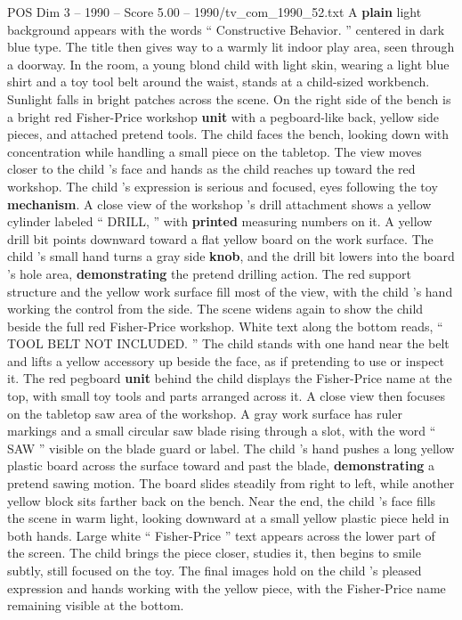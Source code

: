 \begin{textsample}{POS Dim 3 – 1990 – Score 5.00 – 1990/tv\_com\_1990\_52.txt}  \label{ex:f3_pos_056}
A \textbf{plain} light background appears with the words “ Constructive Behavior. ” centered in dark blue type.
The title then gives way to a warmly lit indoor play area, seen through a doorway.
In the room, a young blond child with light skin, wearing a light blue shirt and a toy tool belt around the waist, stands at a child-sized workbench.
Sunlight falls in bright patches across the scene.
On the right side of the bench is a bright red Fisher-Price workshop \textbf{unit} with a pegboard-like back, yellow side pieces, and attached pretend tools.
The child faces the bench, looking down with concentration while handling a small piece on the tabletop.
The view moves closer to the child ’s face and hands as the child reaches up toward the red workshop.
The child ’s expression is serious and focused, eyes following the toy \textbf{mechanism}.
A close view of the workshop ’s drill attachment shows a yellow cylinder labeled “ DRILL, ” with \textbf{printed} measuring numbers on it.
A yellow drill bit points downward toward a flat yellow board on the work surface.
The child ’s small hand turns a gray side \textbf{knob}, and the drill bit lowers into the board ’s hole area, \textbf{demonstrating} the pretend drilling action.
The red support structure and the yellow work surface fill most of the view, with the child ’s hand working the control from the side.
The scene widens again to show the child beside the full red Fisher-Price workshop.
White text along the bottom reads, “ TOOL BELT NOT INCLUDED. ” The child stands with one hand near the belt and lifts a yellow accessory up beside the face, as if pretending to use or inspect it.
The red pegboard \textbf{unit} behind the child displays the Fisher-Price name at the top, with small toy tools and parts arranged across it.
A close view then focuses on the tabletop saw area of the workshop.
A gray work surface has ruler markings and a small circular saw blade rising through a slot, with the word “ SAW ” visible on the blade guard or label.
The child ’s hand pushes a long yellow plastic board across the surface toward and past the blade, \textbf{demonstrating} a pretend sawing motion.
The board slides steadily from right to left, while another yellow block sits farther back on the bench.
Near the end, the child ’s face fills the scene in warm light, looking downward at a small yellow plastic piece held in both hands.
Large white “ Fisher-Price ” text appears across the lower part of the screen.
The child brings the piece closer, studies it, then begins to smile subtly, still focused on the toy.
The final images hold on the child ’s pleased expression and hands working with the yellow piece, with the Fisher-Price name remaining visible at the bottom.

\end{textsample}
